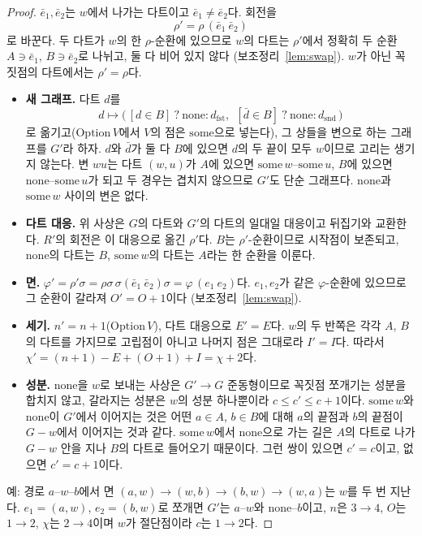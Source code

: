 \begin{proof}
\leanok
\(\bar e_1, \bar e_2\)는 \(w\)에서 나가는 다트이고 \(\bar e_1 \ne \bar e_2\)다. 회전을
\[
  \rho' = \rho\,(\bar e_1\ \bar e_2)
\]
로 바꾼다. 두 다트가 \(w\)의 한 \(\rho\)-순환에 있으므로 \(w\)의 다트는 \(\rho'\)에서 정확히 두 순환
\(A \ni \bar e_1\), \(B \ni \bar e_2\)로 나뉘고, 둘 다 비어 있지 않다 (보조정리~\ref{lem:swap}).
\(w\)가 아닌 꼭짓점의 다트에서는 \(\rho' = \rho\)다.
\begin{itemize}
  \item \textbf{새 그래프.} 다트 \(d\)를
        \[
          d \mapsto \bigl(\,[d \in B]\ ?\ \mathrm{none} : d_{\mathrm{fst}},\ \
          [\bar d \in B]\ ?\ \mathrm{none} : d_{\mathrm{snd}}\,\bigr)
        \]
        로 옮기고(\(\mathrm{Option}\,V\)에서 \(V\)의 점은 \(\mathrm{some}\)으로 넣는다), 그 상들을 변으로 하는
        그래프를 \(G'\)라 하자. \(d\)와 \(\bar d\)가 둘 다 \(B\)에 있으면 \(d\)의 두 끝이 모두 \(w\)이므로
        고리는 생기지 않는다. 변 \(wu\)는 다트 \((w,u)\)가 \(A\)에 있으면 \(\mathrm{some}\,w\)--\(\mathrm{some}\,u\),
        \(B\)에 있으면 \(\mathrm{none}\)--\(\mathrm{some}\,u\)가 되고 두 경우는 겹치지 않으므로 \(G'\)도 단순
        그래프다. \(\mathrm{none}\)과 \(\mathrm{some}\,w\) 사이의 변은 없다.
  \item \textbf{다트 대응.} 위 사상은 \(G\)의 다트와 \(G'\)의 다트의 일대일 대응이고 뒤집기와 교환한다.
        \(R'\)의 회전은 이 대응으로 옮긴 \(\rho'\)다. \(B\)는 \(\rho'\)-순환이므로 시작점이 보존되고,
        \(\mathrm{none}\)의 다트는 \(B\), \(\mathrm{some}\,w\)의 다트는 \(A\)라는 한 순환을 이룬다.
  \item \textbf{면.} \(\varphi' = \rho'\sigma = \rho\sigma\,\sigma(\bar e_1\ \bar e_2)\sigma
        = \varphi\,(e_1\ e_2)\)다. \(e_1, e_2\)가 같은 \(\varphi\)-순환에 있으므로 그 순환이 갈라져
        \(O' = O + 1\)이다 (보조정리~\ref{lem:swap}).
  \item \textbf{세기.} \(n' = n + 1\)(\(\mathrm{Option}\,V\)), 다트 대응으로 \(E' = E\)다. \(w\)의 두 반쪽은
        각각 \(A\), \(B\)의 다트를 가지므로 고립점이 아니고 나머지 점은 그대로라 \(I' = I\)다. 따라서
        \(\chi' = (n+1) - E + (O+1) + I = \chi + 2\)다.
  \item \textbf{성분.} \(\mathrm{none}\)을 \(w\)로 보내는 사상은 \(G' \to G\) 준동형이므로 꼭짓점 쪼개기는
        성분을 합치지 않고, 갈라지는 성분은 \(w\)의 성분 하나뿐이라 \(c \le c' \le c + 1\)이다.
        \(\mathrm{some}\,w\)와 \(\mathrm{none}\)이 \(G'\)에서 이어지는 것은 어떤 \(a \in A\), \(b \in B\)에 대해
        \(a\)의 끝점과 \(b\)의 끝점이 \(G - w\)에서 이어지는 것과 같다. \(\mathrm{some}\,w\)에서 \(\mathrm{none}\)으로
        가는 길은 \(A\)의 다트로 나가 \(G - w\) 안을 지나 \(B\)의 다트로 들어오기 때문이다. 그런 쌍이 있으면
        \(c' = c\)이고, 없으면 \(c' = c + 1\)이다.
\end{itemize}
예: 경로 \(a\)--\(w\)--\(b\)에서 면 \((a,w) \to (w,b) \to (b,w) \to (w,a)\)는 \(w\)를 두 번 지난다.
\(e_1 = (a,w)\), \(e_2 = (b,w)\)로 쪼개면 \(G'\)는 \(a\)--\(w\)와 \(\mathrm{none}\)--\(b\)이고, \(n\)은
\(3 \to 4\), \(O\)는 \(1 \to 2\), \(\chi\)는 \(2 \to 4\)이며 \(w\)가 절단점이라 \(c\)는 \(1 \to 2\)다.


\end{proof}
